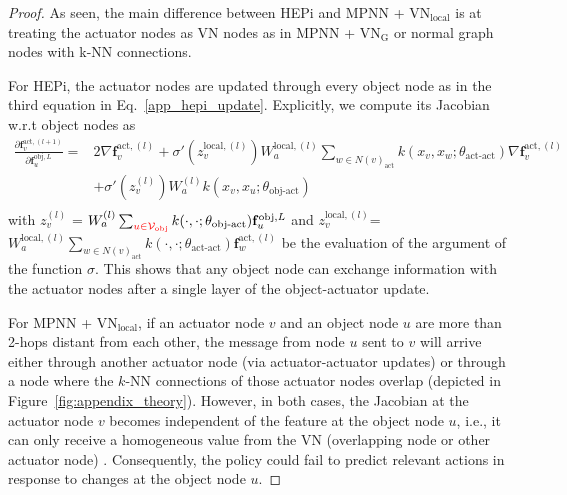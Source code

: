 \begin{proof}
As seen, the main difference between HEPi and $\text{MPNN}$ + $\text{VN}_\text{local}$ is at treating the actuator nodes as VN nodes as in $\text{MPNN}$ + $\text{VN}_\text{G}$ or normal graph nodes with k-NN connections.

For HEPi, the actuator nodes are updated through every object node as in the third equation in Eq.~\ref{app_hepi_update}. Explicitly, we compute its Jacobian w.r.t object nodes as
\begin{equation}
\begin{aligned}
    \frac{\partial \mathbf{f}_v^{\text{act}, (l+1)}}
    {\partial \mathbf{f}_u^{\text{obj}, L}} =& 2\nabla  \mathbf{f}_v^{\text{act}, (l)}  + \sigma'(z_v^{\text{local},(l)}) W_a^{\text{local}, (l)} \sum_{w \in N(v)_\text{act}}k(x_v,x_w; \theta_\text{act-act}) \nabla  \mathbf{f}_v^{\text{act}, (l)} \\
    &+ \sigma'(z_v^{(l)}) W_{a}^{(l)} k(x_v,x_u; \theta_\text{obj-act}) \\
\end{aligned}
\label{app_jacobian}
\end{equation}
with $z_v^{(l)}$ = $W_{a}^{(l)} \sum_{{\color{red}u \in {\cal V}_\text{obj}}} k(\cdot, \cdot; \theta_\text{obj-act}) \mathbf{f}_u^{\text{obj}, L} $ and $z_v^{\text{local},(l)}$=$W_a^{\text{local}, (l)} \sum_{w \in N(v)_\text{act}} k(\cdot, \cdot; \theta_\text{act-act}) \mathbf{f}_w^{\text{act}, (l)} $ be the evaluation of the argument of the function $\sigma$. This shows that any object node can exchange information with the actuator nodes after a single layer of the object-actuator update.

For $\text{MPNN}$ + $\text{VN}_\text{local}$, if an actuator node $v$ and an object node $u$ are more than 2-hops distant from each other, the message from node $u$ sent to $v$ will arrive either through another actuator node (via actuator-actuator updates) or through a node where the $k$-NN connections of those actuator nodes overlap (depicted in Figure~\ref{fig:appendix_theory}). However, in both cases, the Jacobian at the actuator node $v$ becomes independent of the feature at the object node $u$, i.e., it can only receive a homogeneous value from the VN (overlapping node or other actuator node) \citep{southern2024understanding}. Consequently, the policy could fail to predict relevant actions in response to changes at the object node $u$.
\end{proof}

